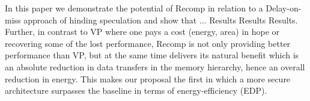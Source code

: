 In this paper we demonstrate the potential of Recomp in relation to a Delay-on-miss approach of hinding speculation and show that ... Results Results Results. Further, {\color{red} in contrast to VP where one pays a cost (energy, area) in hope or recovering some of the lost performance, Recomp is not only providing better performance than VP, but at the same time delivers its natural benefit which is an absolute reduction in data transfers in the memory hierarchy, hence an overall reduction in energy. This makes our proposal the first in which a more secure architecture surpasses the baseline in terms of energy-efficiency (EDP).}




